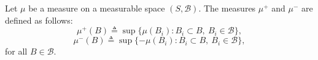   \begin{comment}

\begin{theorem} \cite[Theorem 3.1.1]{bogachevMeasureTheory2007}
  Let \( \mu \) be a measure on a measurable space \( (S, \mathcal{B}) \). Then, there exist disjoint sets \( S^-, S^+ \in \mathcal{A} \) such that $S^- \cup S^+ = S$
and for all \( B \in \mathcal{B} \), one has
\[
\mu(B \cap S^-) \leq 0 \quad \text{and} \quad \mu(B \cap S^+) \geq 0.
\]
\end{theorem}

\begin{corollary} \cite[Corollary 3.1.2]{bogachevMeasureTheory2007}
  Attending to the theorem above, define:
\[
\mu^+(B) := \mu(B \cap S^+), \quad \mu^-(B) := -\mu(B \cap S^-). 
\]
Then \( \mu^+ \) and \( \mu^- \) are nonnegative measures, and we have:
\[
\mu = \mu^+ - \mu^-.
\]
\end{corollary}

The measures \( \mu^+ \) and \( \mu^- \) have the following properties:
\[
\mu^+(B) = \sup\{ \mu(B_i) : B_i \subset B,\ B_i \in \mathcal{B} \},
\]
\[
\mu^-(B) = \sup\{ -\mu(B_i) : B_i \subset B,\ B_i \in \mathcal{B} \},
\]
for all \( B \in \mathcal{B} \).

\begin{definition} \label{def:signed_meas}
  Let $\mu^+$ and $\mu^-$ be defined as in the corollary above. Then, for a measure \( \mu \), the \emph{total variation norm} is defined as
   \[\norm{\mu} = \mu^{+}(S) + \mu^{-}(S).\] 
\end{definition}

\begin{comment}
  \begin{definition} \cite{tsybakov2008}
    Let  let $P$ and $Q$ be two probability measures on $\mathcal{M}\mathbb{R}$. Define
    $$
      \nu = P + Q, \quad p = \frac{dP}{d\nu}, \quad q = \frac{dQ}{d\nu},
    $$
    where $\frac{dP}{d\nu}$ denotes the  the Radon–Nikodym derivative of the measure $P$ with respect to the measure $\nu$. It holds that:
    \begin{align*}
      \norm{P-Q} = \sup_{A \in  \mathcal{B}} \left\{ \left\vert \int_{A} (p - q) \, d\nu \right\vert \right\}.
    \end{align*}
     \end{definition}
\end{comment}

\begin{definition}
  Let \( \mu \) be a measure on a measurable space \( (S, \mathcal{B}) \). The measures \( \mu^+ \) and \( \mu^- \) are defined as follows:
\[
\mu^+(B) \triangleq \sup\{ \mu(B_i) : B_i \subset B,\ B_i \in \mathcal{B} \},
\]
\[
\mu^-(B) \triangleq \sup\{ -\mu(B_i) : B_i \subset B,\ B_i \in \mathcal{B} \},
\]
for all \( B \in \mathcal{B} \).
  
\end{definition}

